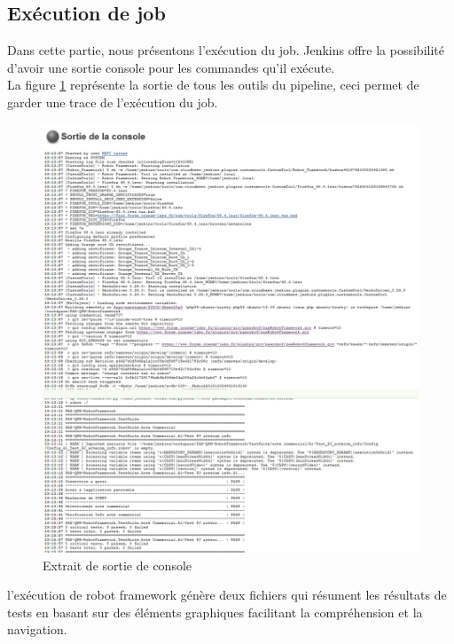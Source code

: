 \subsection{Exécution de job}
Dans cette partie, nous présentons l’exécution du job. Jenkins offre la possibilité d’avoir une sortie console pour les commandes qu’il exécute.\\
La figure \ref{fig:exemple-console} représente la sortie de tous les outils du pipeline, ceci permet de garder une trace de l’exécution du job.
\begin{figure}[H]
	\centering
	\includegraphics[width=1\linewidth]{"img/jenkins/exemple console"}
	\caption[Extrait de sortie de console]{Extrait de sortie de console}
	\label{fig:exemple-console}
\end{figure}
l’exécution de robot framework génère deux fichiers qui résument les résultats de tests en basant sur des éléments graphiques facilitant la compréhension et la navigation.
